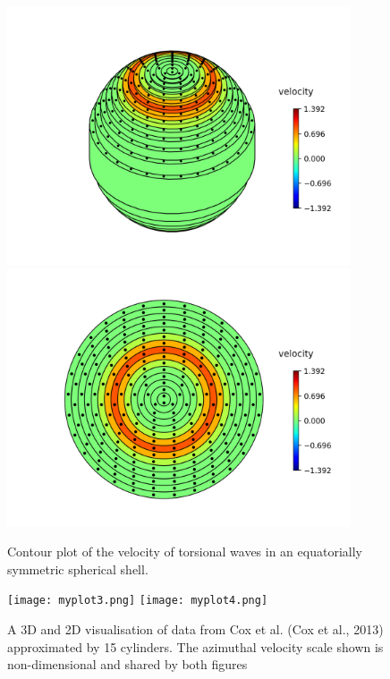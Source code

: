 \documentclass{article}
\begin{document}
\begin{figure}[H]
	    \centering
	        \includegraphics[height=3in]{myplot1.png}
		    \includegraphics[height=3in]{myplot2.png}
		        \caption{Contour plot of the velocity of torsional waves in an equatorially symmetric spherical shell.}\label{fig:mesh1}			    
\end{figure}
\begin{figure}[H]
	    \centering
	        \texttt{[image: myplot3.png]}
		    \texttt{[image: myplot4.png]} 
		        \caption{A 3D and 2D visualisation of data from Cox et al. (Cox et al., 2013) approximated by 15 cylinders. The azimuthal velocity scale shown is non-dimensional and shared by both figures}
			     \label{fig:mesh1}
\end{figure}

    
        
\end{document}

